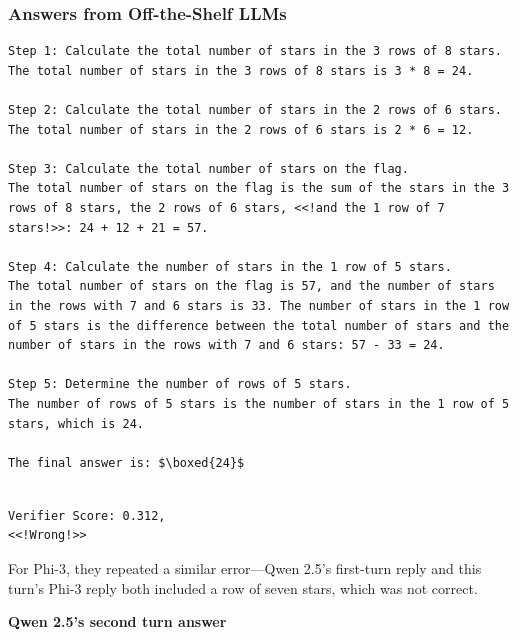 \subsubsection{Answers from Off-the-Shelf LLMs}
\begin{lstlisting}[breaklines=true]
Step 1: Calculate the total number of stars in the 3 rows of 8 stars.
The total number of stars in the 3 rows of 8 stars is 3 * 8 = 24.

Step 2: Calculate the total number of stars in the 2 rows of 6 stars.
The total number of stars in the 2 rows of 6 stars is 2 * 6 = 12.

Step 3: Calculate the total number of stars on the flag.
The total number of stars on the flag is the sum of the stars in the 3 rows of 8 stars, the 2 rows of 6 stars, <<!and the 1 row of 7 stars!>>: 24 + 12 + 21 = 57.

Step 4: Calculate the number of stars in the 1 row of 5 stars.
The total number of stars on the flag is 57, and the number of stars in the rows with 7 and 6 stars is 33. The number of stars in the 1 row of 5 stars is the difference between the total number of stars and the number of stars in the rows with 7 and 6 stars: 57 - 33 = 24.

Step 5: Determine the number of rows of 5 stars.
The number of rows of 5 stars is the number of stars in the 1 row of 5 stars, which is 24.

The final answer is: $\boxed{24}$


\end{lstlisting}
\begin{lstlisting}
Verifier Score: 0.312,
<<!Wrong!>> 
\end{lstlisting}
For Phi-3, they repeated a similar error—Qwen 2.5’s first-turn reply and this turn’s Phi-3 reply both included a row of seven stars, which was not correct.

\textbf{Qwen 2.5's second turn answer }

